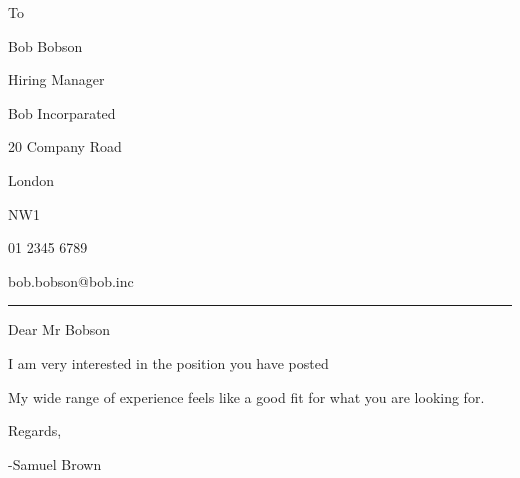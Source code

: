 \documentclass[12pt]{developercv} %
\begin{document}
\begin{minipage}[t]{0.6\textwidth}
{
To

\large Bob Bobson

\large Hiring Manager

\large Bob Incorparated

\large 20 Company Road

\large London

\large NW1

\large 01 2345 6789

\large bob.bobson@bob.inc

}

\end{minipage}


\vspace{+\baselineskip}
\hrule
\vspace{+\baselineskip}




Dear Mr Bobson
\vspace{+\baselineskip}

I am very interested in the position you have posted
\vspace{+\baselineskip}

My wide range of experience feels like a good fit for what you are looking for.



\vspace{+\baselineskip}

Regards,


-Samuel Brown
\end{document}
